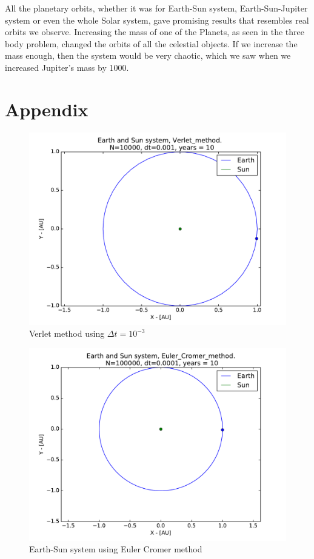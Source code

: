 \documentclass[12pt]{article}
\begin{document}
All the planetary orbits, whether it was for Earth-Sun system, Earth-Sun-Jupiter system or even the whole Solar system, gave promising results that resembles real orbits we observe. Increasing the mass of one of the Planets, as seen in the three body problem, changed the orbits of all the celestial objects. If we increase the mass enough, then the system would be very chaotic, which we saw when we increased Jupiter's mass by 1000.

\section*{Appendix}
\begin{figure}[!h]
\centering
\includegraphics[width=\linewidth]{Plots/Earth_Sun_Verlet_method_larger_dt.pdf}
\caption{Verlet method using $\Delta t = 10^{-3}$}
\label{fig:balle3}
\end{figure}

\begin{figure}[!h]
\centering
\includegraphics[width=\linewidth]{Plots/Earth_Sun_Euler_Cromer_method.pdf}
\caption{Earth-Sun system using Euler Cromer method}
\label{fig:Appendix_EulerCromer}
\end{figure}
\end{document}
